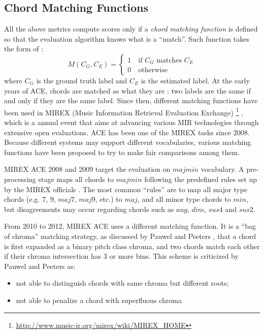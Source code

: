 \subsection{Chord Matching Functions}\label{sec:2-chordmatch}
All the above metrics compute scores only if a {\it chord matching function} is defined so that the evaluation algorithm knows what is a ``match''. Such function takes the form of \cite{harte2010towards}:
\begin{equation}
M(C_G,C_E)=
\begin{cases}
1 \quad \text{if $C_G$ matches $C_E$} \\
0 \quad \text{otherwise}
\end{cases}
\end{equation}
where $C_G$ is the ground truth label and $C_E$ is the estimated label. At the early years of ACE, chords are matched as what they are \cite{fujishima1999realtime,sheh2003chord,bello2005robust}: two labels are the same if and only if they are the same label. Since then, different matching functions have been used in MIREX (Music Information Retrieval Evaluation Exchange) \footnote{\url{http://www.music-ir.org/mirex/wiki/MIREX\_HOME}} \cite{downie2008music}, which is a annual event that aims at advancing various MIR technologies through extensive open evaluations. ACE has been one of the MIREX tasks since 2008. Because different systems may support different vocabularies, various matching functions have been proposed to try to make fair comparisons among them.

MIREX ACE 2008 and 2009 target the evaluation on $majmin$ vocabulary. A pre-processing stage maps all chords to $majmin$ following the predefined rules set up by the MIREX officials \cite{harte2010towards}. The most common ``rules'' are to map all major type chords (e.g. $7$, $9$, $maj7$, $maj9$, etc.) to $maj$, and all minor type chords to $min$, but disagreements may occur regarding chords such as $aug$, $dim$, $sus4$ and $sus2$.

From 2010 to 2012, MIREX ACE uses a different matching function. It is a ``bag of chroma'' matching strategy, as discussed by Pauwel and Peeters \cite{pauwels2013evaluating}, that a chord is first expanded as a binary pitch class chroma, and two chords match each other if their chroma intersection has 3 or more bins. This scheme is criticized by Pauwel and Peeters \cite{pauwels2013evaluating} as:
\begin{itemize}
\item not able to distinguish chords with same chroma but different roots;
\item not able to penalize a chord with superfluous chroma
\end{itemize}

